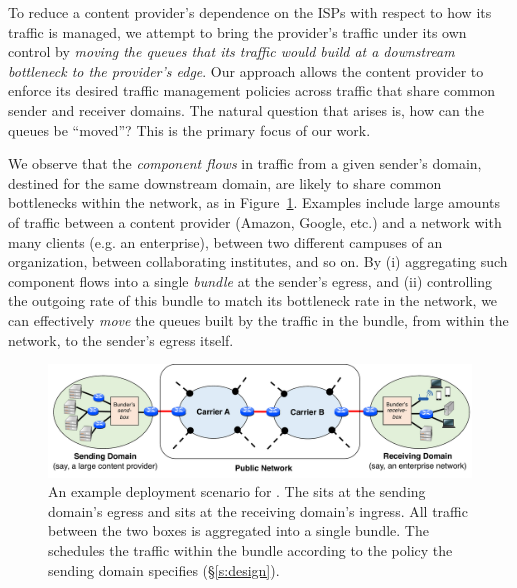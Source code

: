 To reduce a content provider's dependence on the ISPs with respect to how its traffic is managed, we attempt to bring the provider's traffic under its own control by \emph{moving the queues that its traffic would build at a downstream bottleneck to the provider's edge}. Our approach allows the content provider to enforce its desired traffic management policies across traffic that share common sender and receiver domains.
The natural question that arises is, how can the queues be ``moved''? This is the primary focus of our work. 

We observe that the \emph{component flows} in traffic from a given sender's domain, destined for the same downstream domain, are likely to share common bottlenecks within the network, as in Figure~\ref{fig:deploy:arch}. Examples include large amounts of traffic between a content provider (\eg Amazon, Google, etc.) and a network with many clients (e.g. an enterprise), between two different campuses of an organization, between collaborating institutes, and so on. By (i) aggregating such component flows into a single \emph{bundle} at the sender's egress, and (ii) controlling the outgoing rate of this bundle to match its bottleneck rate in the network, we can effectively \emph{move} the queues built by the traffic in the bundle, from within the network, to the sender's egress itself. 
\begin{figure}[t]
    \centering
    \includegraphics[width=\textwidth]{img/deployment-arch.pdf}
    \caption{An example deployment scenario for \name. 
    The \inbox sits at the sending domain's egress and \outbox sits at the receiving domain's ingress. All traffic between the two boxes is aggregated into a single bundle. The \inbox schedules the traffic within the bundle according to the policy the sending domain specifies (\S\ref{s:design}).
    }\label{fig:deploy:arch}
\end{figure}

